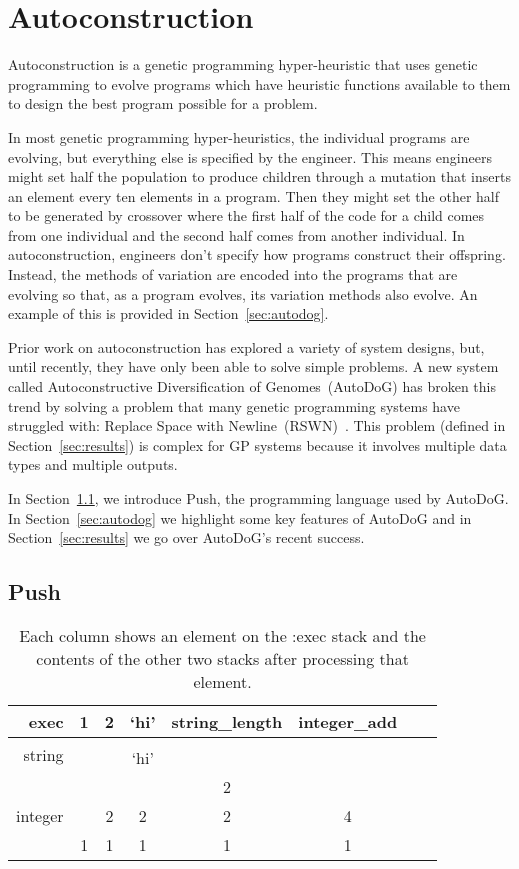 \documentclass{sig-alternate}
\begin{document}
\section{Autoconstruction}
\label{sec:ac}
Autoconstruction is a genetic programming hyper-heur\-istic that uses genetic programming to evolve programs which have heuristic functions available to them to design the best program possible for a problem. 

In most genetic programming hyper-heuristics, the individual programs are evolving, but everything else is specified by the engineer. This means engineers might set half the population to produce children through a mutation that inserts an element every ten elements in a program. Then they might set the other half to be generated by crossover where the first half of the code for a child comes from one individual and the second half comes from another individual. In autoconstruction, engineers don't specify how programs construct their offspring. Instead, the methods of variation are encoded into the programs that are evolving so that, as a program evolves, its variation methods also evolve. An example of this is provided in Section~\ref{sec:autodog}.

Prior work on autoconstruction has explored a variety of system designs, but, until recently, they have only been able to solve simple problems. A new system called Autoconstructive Diversification of Genomes~(AutoDoG) has broken this trend by solving a problem that many genetic programming systems have struggled with: Replace Space with Newline~(RSWN)~\cite{spector:2016}. This problem (defined in Section~\ref{sec:results}) is complex for GP systems because it involves multiple data types and multiple outputs.

In Section~\ref{sec:push}, we introduce Push, the programming language used by AutoDoG. In Section~\ref{sec:autodog} we highlight some key features of AutoDoG and in Section~\ref{sec:results} we go over AutoDoG's recent success.

\subsection{Push}
\label{sec:push}

\begin{table}
	\centering
	\begin{tabular}{|r|c|c|c|c|c|c|c|}
		\hline
		exec & 1 & 2 & `hi' & string\_length & integer\_add \\
		\hline
		\hline
		\multirow{2}{*}{string} & & & & & \\
		& & & `hi' &  &  \\
		\hline
		\multirow{3}{*}{integer} & & & & 2 & \\
		& & 2 & 2 & 2 & 4 \\
		& 1 & 1 & 1 & 1 & 1\\
		\hline
	\end{tabular}
	\caption{Each column shows an element on the :exec stack and the contents of the other two stacks after processing that element.}
	\label{tab:push}
\end{table}
\end{document}
